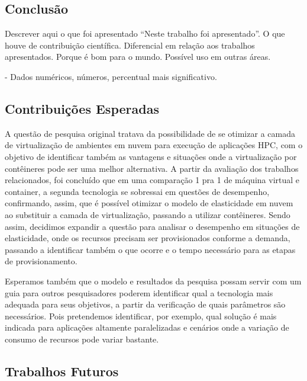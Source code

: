 \documentclass[twoside,english,brazilian]{UNISINOSartigo}
\begin{document}
\begin{itemize}
\chapter{Conclusão}
\label{conclusion}

Descrever aqui o que foi apresentado ``Neste trabalho foi apresentado''. O que houve de contribuição científica.
Diferencial em relação aos trabalhos apresentados. Porque é bom para o mundo.
Possível uso em outras áreas.

- Dados numéricos, números, percentual mais significativo.

\section{Contribuições Esperadas}
\label{contribuicoes}

A questão de pesquisa original tratava da possibilidade de se otimizar a camada de virtualização de ambientes em nuvem para execução de aplicações HPC, com o objetivo de identificar também as vantagens e situações onde a virtualização por contêineres pode ser uma melhor alternativa. A partir da avaliação dos trabalhos relacionados, foi concluído que em uma comparação 1 pra 1 de máquina virtual e container, a segunda tecnologia se sobressai em questões de desempenho, confirmando, assim, que é possível otimizar o modelo de elasticidade em nuvem ao substituir a camada de virtualização, passando a utilizar contêineres. Sendo assim, decidimos expandir a questão para analisar o desempenho em situações de elasticidade, onde os recursos precisam ser provisionados conforme a demanda, passando a identificar também o que ocorre e o tempo necessário para as etapas de provisionamento. 

Esperamos também que o modelo e resultados da pesquisa possam servir com um guia para outros pesquisadores poderem identificar qual a tecnologia mais adequada para seus objetivos, a partir da verificação de quais parâmetros são necessários. Pois pretendemos identificar, por exemplo, qual solução é mais indicada para aplicações altamente paralelizadas e cenários onde a variação de consumo de recursos pode variar bastante.

\section{Trabalhos Futuros}
\label{futuros}


\end{itemize}
\end{document}
